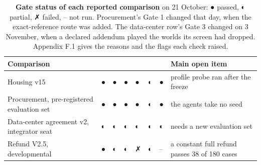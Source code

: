 \renewcommand{\thetable}{6.1}
\begin{longtable}[]{@{}
  >{\raggedright\arraybackslash}p{}
  >{\centering\arraybackslash}p{}
  >{\centering\arraybackslash}p{}
  >{\centering\arraybackslash}p{}
  >{\centering\arraybackslash}p{}
  >{\centering\arraybackslash}p{}
  >{\centering\arraybackslash}p{}
  >{\raggedright\arraybackslash}p{}@{}}
\caption{\textbf{Gate status of each reported comparison} on 21 October: ● passed, ◐ partial, ✗ failed, -- not run.
Procurement's Gate 1 changed that day, when the exact-reference route was added. The data-center row's Gate 3 changed
on 3 November, when a declared addendum played the worlds its screen had dropped. Appendix F.1 gives the reasons and
the flags each check raised.}\label{tab:6.1}\tabularnewline
\toprule\noalign{}
\begin{minipage}[b]{\linewidth}\raggedright
Comparison
\end{minipage} & \begin{minipage}[b]{\linewidth}\centering
0
\end{minipage} & \begin{minipage}[b]{\linewidth}\centering
1
\end{minipage} & \begin{minipage}[b]{\linewidth}\centering
2
\end{minipage} & \begin{minipage}[b]{\linewidth}\centering
3
\end{minipage} & \begin{minipage}[b]{\linewidth}\centering
4
\end{minipage} & \begin{minipage}[b]{\linewidth}\centering
5
\end{minipage} & \begin{minipage}[b]{\linewidth}\raggedright
Main open item
\end{minipage} \\
\midrule\noalign{}
\endhead
\bottomrule\noalign{}
\endlastfoot
Housing v15 & ● & ● & ● & ● & ◐ & ● & profile probe ran after the freeze \\
Procurement, pre-registered evaluation set & ● & ● & ● & ● & ◐ & ● & the agents take no seed \\
Data-center agreement v2, integrator seat & ◐ & ◐ & ◐ & ◐ & ◐ & ◐ & needs a new evaluation set \\
Refund V2.5, developmental & ● & ◐ & ◐ & ✗ & ◐ & -- & a constant full refund passes 38 of 180 cases \\
\end{longtable}

